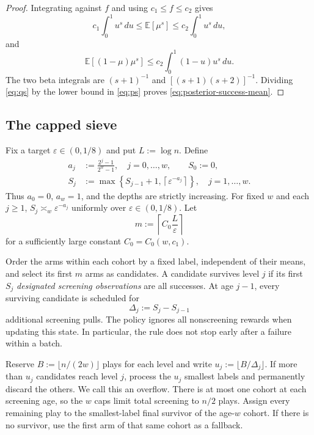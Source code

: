 \documentclass[11pt,letterpaper]{article}
\numberwithin{equation}{section}
\theoremstyle{definition}
\theoremstyle{remark}
\newcommand{\E}{\mathbb{E}}
\newcommand{\1}{\mathbf{1}}
\newcommand{\eps}{\varepsilon}
\begin{document}
\begin{proof}
Integrating against $f$ and using $c_1\le f\le c_2$ gives
\[
  c_1\int_0^1u^s\,du
  \le \E[\mu^s]
  \le c_2\int_0^1u^s\,du,
\]
and
\[
  \E[(1-\mu)\mu^s]
  \le c_2\int_0^1(1-u)u^s\,du.
\]
The two beta integrals are $(s+1)^{-1}$ and
$[(s+1)(s+2)]^{-1}$.  Dividing \cref{eq:qs} by the lower bound in
\cref{eq:ps} proves \cref{eq:posterior-success-mean}.
\end{proof}

\subsection{The capped sieve}

Fix a target $\eps\in(0,1/8)$ and put $L:=\log n$.  Define
\begin{equation}\label{eq:aj-Sj}
  \begin{aligned}
    a_j&:=\frac{2^j-1}{2^w-1},
       \quad j=0,\ldots,w,\qquad S_0:=0,\\
    S_j&:=\max\left\{S_{j-1}+1,
                \left\lceil\eps^{-a_j}\right\rceil\right\},
       \quad j=1,\ldots,w.
  \end{aligned}
\end{equation}
Thus $a_0=0$, $a_w=1$, and the depths are strictly increasing. For fixed
$w$ and each $j\ge1$, $S_j\asymp_w\eps^{-a_j}$ uniformly over
$\eps\in(0,1/8)$.  Let
\begin{equation}\label{eq:m-def}
  m:=\left\lceil C_0\frac{L}{\eps}\right\rceil
\end{equation}
for a sufficiently large constant $C_0=C_0(w,c_1)$.

Order the arms within each cohort by a fixed label, independent of their
means, and select its first $m$ arms as candidates. A candidate survives
level $j$ if its first $S_j$ \emph{designated screening observations} are
all successes. At age $j-1$, every surviving candidate is scheduled for
\[
  \Delta_j:=S_j-S_{j-1}
\]
additional screening pulls. The policy ignores all nonscreening rewards
when updating this state. In particular, the rule does not stop early
after a failure within a batch.

Reserve $B:=\lfloor n/(2w)\rfloor$ plays for each level and write
$u_j:=\lfloor B/\Delta_j\rfloor$. If more than $u_j$ candidates reach
level $j$, process the $u_j$ smallest labels and permanently discard
the others. We call this an overflow. There is at most one cohort at
each screening age, so the $w$ caps limit total screening to $n/2$ plays.
Assign every remaining play to the smallest-label final survivor of
the age-$w$ cohort. If there is no survivor, use the first arm of
that same cohort as a fallback.
\end{document}
